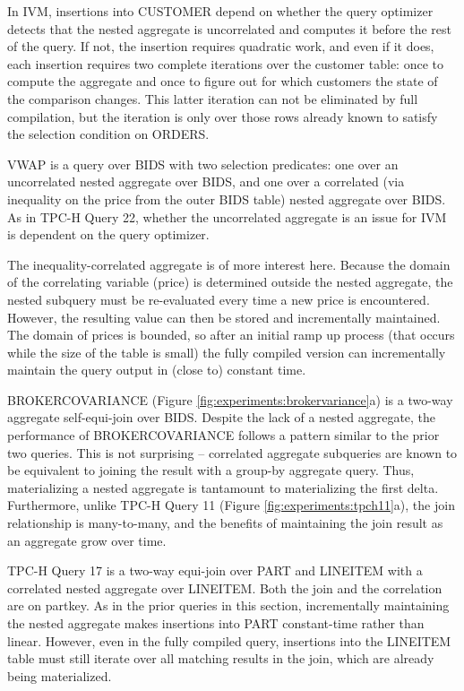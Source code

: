 In IVM, insertions into CUSTOMER depend on whether the query optimizer detects that the nested aggregate is uncorrelated and computes it before the rest of the query.  If not, the insertion requires quadratic work, and even if it does, each insertion requires two complete iterations over the customer table: once to compute the aggregate and once to figure out for which customers the state of the comparison changes.  This latter iteration can not be eliminated by full compilation, but the iteration is only over those rows already known to satisfy the selection condition on ORDERS.

VWAP is a query over BIDS with two selection predicates: one over an uncorrelated nested aggregate over BIDS, and one over a correlated (via inequality on the price from the outer BIDS table) nested aggregate over BIDS.  As in TPC-H Query 22, whether the uncorrelated aggregate is an issue for IVM is dependent on the query optimizer.  

The inequality-correlated aggregate is of more interest here.  Because the domain of the correlating variable (price) is determined outside the nested aggregate, the nested subquery must be re-evaluated every time a new price is encountered.  However, the resulting value can then be stored and incrementally maintained.  The domain of prices is bounded, so after an initial ramp up process (that occurs while the size of the table is small) the fully compiled version can incrementally maintain the query output in (close to) constant time.

BROKERCOVARIANCE (Figure \ref{fig:experiments:brokervariance}a) is a two-way aggregate self-equi-join over BIDS.  Despite the lack of a nested aggregate, the performance of BROKERCOVARIANCE follows a pattern similar to the prior two queries.  This is not surprising -- correlated aggregate subqueries are known to be equivalent to joining the result with a group-by aggregate query.  Thus, materializing a nested aggregate is tantamount to materializing the first delta.  Furthermore, unlike TPC-H Query 11 (Figure \ref{fig:experiments:tpch11}a), the join relationship is many-to-many, and the benefits of maintaining the join result as an aggregate grow over time.

TPC-H Query 17 is a two-way equi-join over PART and LINEITEM with a correlated nested aggregate over LINEITEM.  Both the join and the correlation are on partkey.  As in the prior queries in this section, incrementally maintaining the nested aggregate makes insertions into PART constant-time rather than linear.  However, even in the fully compiled query, insertions into the LINEITEM table must still iterate over all matching results in the join, which are already being materialized.  

